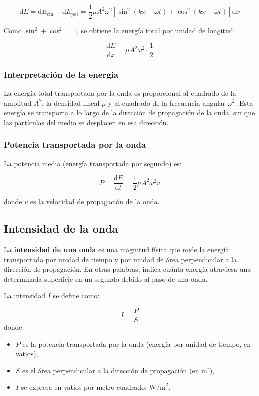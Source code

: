 \[
\mathrm{d}E = \mathrm{d}E_{\text{cin}} + \mathrm{d}E_{\text{pot}} = \frac{1}{2} \mu A^2 \omega^2 \left[ \sin^2(kx - \omega t) + \cos^2(kx - \omega t) \right] \mathrm{d}x
\]

Como \(\sin^2 + \cos^2 = 1\), se obtiene la energía total por unidad de longitud:

\[
\frac{\mathrm{d}E}{\mathrm{d}x} = \mu A^2 \omega^2 \cdot \frac{1}{2}
\]


\subsubsection{Interpretación de la energía}

La energía total transportada por la onda es proporcional al cuadrado de la amplitud \(A^2\), la densidad lineal \(\mu\) y al cuadrado de la frecuencia angular \(\omega^2\). Esta energía se transporta a lo largo de la dirección de propagación de la onda, sin que las partículas del medio se desplacen en esa dirección.

\subsubsection{Potencia transportada por la onda}

La potencia media (energía transportada por segundo) es:

\[
P = \frac{\mathrm{d}E}{\mathrm{d}t} = \frac{1}{2} \mu A^2 \omega^2 v
\]

donde \(v\) es la velocidad de propagación de la onda.


\subsection{Intensidad de la onda}

La \textbf{intensidad de una onda} es una magnitud física que mide la energía transportada por unidad de tiempo y por unidad de área perpendicular a la dirección de propagación. En otras palabras, indica cuánta energía atraviesa una determinada superficie en un segundo debido al paso de una onda.

La intensidad \(I\) se define como:

\[
I = \frac{P}{S}
\]
donde:
\begin{itemize}
  \item \(P\) es la potencia transportada por la onda (energía por unidad de tiempo, en vatios),
  \item \(S\) es el área perpendicular a la dirección de propagación (en m²),
  \item \(I\) se expresa en vatios por metro cuadrado: \(\text{W/m}^2\).
\end{itemize}

